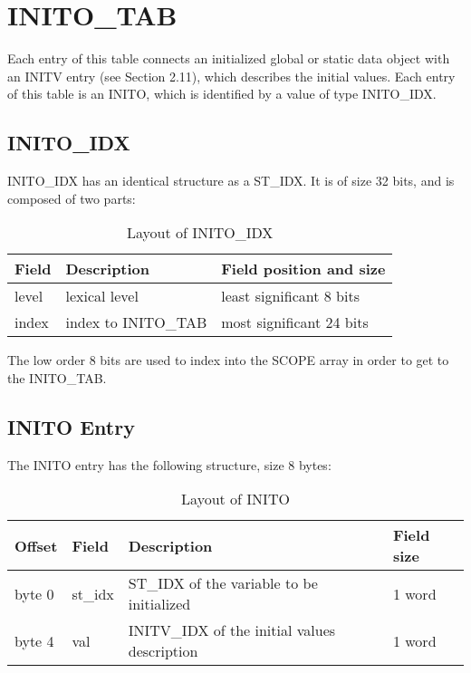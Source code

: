 \section{INITO\_TAB}

Each entry of this table connects an initialized global or static data
object with an
%
INITV entry (see Section 2.11), which describes the
initial values. Each entry of this table is an INITO, which is
identified by a value of type INITO\_IDX.

\subsection{INITO\_IDX}

%
INITO\_IDX has an identical structure as a ST\_IDX. It is of size 32
bits, and is composed of two parts:

\begin{table}[h]
\centering
\caption{Layout of INITO\_IDX}
\label{table27} 
\begin{tabular}{|l|l|p{3in}|}\hline
Field & Description & Field position and size\\\hline\hline
level & lexical level & least significant 8 bits \\\hline
index & index to
\index{INITO\_TAB}%
INITO\_TAB & most significant 24 bits\\\hline
\end{tabular}
\end{table}

The low order 8 bits are used to index into the
%
SCOPE array in order
to get to the INITO\_TAB.

\subsection{INITO Entry}

The
%
INITO entry has the following structure, size 8 bytes:

\begin{table}[h]
\centering
\caption{Layout of INITO} 
\label{table28}
\begin{tabular}{|l|l|l|l|}\hline
Offset & Field & Description & Field size \\\hline\hline
byte 0 & st\_idx &
\index{ST\_IDX}%
ST\_IDX of the variable to be initialized & 1 word \\\hline
byte 4 & val &
\index{INITV\_IDX}%
INITV\_IDX of the initial values description & 1 word\\\hline
\end{tabular}
\end{table}

